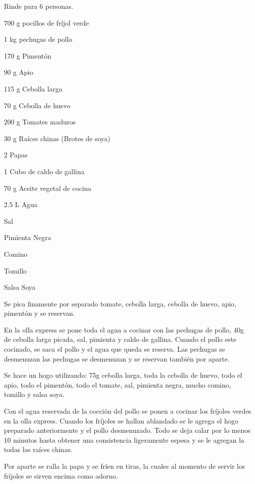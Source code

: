 
Rinde para 6 personas.


\begin{ingredientes}
\item 700 g pocillos de fríjol verde 
\item 1 kg pechugas de pollo
\item 170 g Pimentón
\item 90 g Apio
\item 115 g Cebolla larga
\item 70 g Cebolla de huevo
\item 200 g Tomates maduros
\item 30 g Raíces chinas (Brotes de soya)
\item 2 Papas
\item 1 Cubo de caldo de gallina
\item 70 g Aceite vegetal de cocina
\item 2.5 L Agua
\item Sal
\item Pimienta Negra
\item Comino  
\item Tomillo
\item Salsa Soya
\end{ingredientes}
\preparacion


Se pica finamente por separado tomate, cebolla larga, cebolla de huevo, apio, pimentón y se reservan.

En la olla express se pone toda el agua a cocinar con las pechugas de pollo, 40g de cebolla larga picada, sal, pimienta y caldo de gallina. Cuando el pollo este cocinado, se saca el pollo y el agua que queda se reserva. Las pechugas se desmenuzan las pechugas se desmenuzan y se reservan también por aparte. 

Se hace un hogo utilizando: 75g cebolla larga, toda la cebolla de huevo, todo el apio, todo el pimentón, todo el tomate, sal, pimienta negra, mucho comino, tomillo y salsa soya.

Con el agua reservada de la cocción del pollo se ponen a cocinar los fríjoles verdes en la olla express. Cuando los fríjoles se hallan ablandado se le agrega el hogo preparado anteriormente y el pollo desmenuzado. Todo se deja calar por lo menos 10 minutos hasta obtener una consistencia ligeramente espesa y se le agregan la todas las raíces chinas.

Por aparte se ralla la papa y se fríen en tiras, la cuales al momento de servir los fríjoles se sirven encima como adorno.